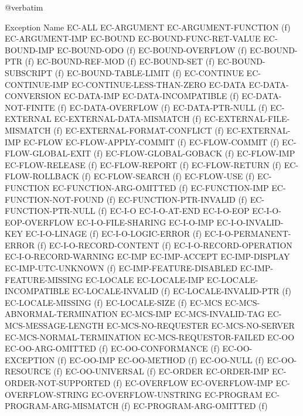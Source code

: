 @verbatim

Exception Name                  
EC-ALL
  EC-ARGUMENT               
    EC-ARGUMENT-FUNCTION (f)
    EC-ARGUMENT-IMP
  EC-BOUND                  
    EC-BOUND-FUNC-RET-VALUE
    EC-BOUND-IMP
    EC-BOUND-ODO (f)
    EC-BOUND-OVERFLOW (f)
    EC-BOUND-PTR (f)
    EC-BOUND-REF-MOD (f)
    EC-BOUND-SET (f)
    EC-BOUND-SUBSCRIPT (f)
    EC-BOUND-TABLE-LIMIT (f)
  EC-CONTINUE               
    EC-CONTINUE-IMP
    EC-CONTINUE-LESS-THAN-ZERO
  EC-DATA                   
    EC-DATA-CONVERSION
    EC-DATA-IMP
    EC-DATA-INCOMPATIBLE (f)
    EC-DATA-NOT-FINITE (f)
    EC-DATA-OVERFLOW (f)
    EC-DATA-PTR-NULL (f)
  EC-EXTERNAL               
    EC-EXTERNAL-DATA-MISMATCH (f)
    EC-EXTERNAL-FILE-MISMATCH (f)
    EC-EXTERNAL-FORMAT-CONFLICT (f)
    EC-EXTERNAL-IMP
  EC-FLOW                   
    EC-FLOW-APPLY-COMMIT (f)
    EC-FLOW-COMMIT (f)
    EC-FLOW-GLOBAL-EXIT (f)
    EC-FLOW-GLOBAL-GOBACK (f)
    EC-FLOW-IMP
    EC-FLOW-RELEASE (f)
    EC-FLOW-REPORT (f)
    EC-FLOW-RETURN (f)
    EC-FLOW-ROLLBACK (f)
    EC-FLOW-SEARCH (f)
    EC-FLOW-USE (f)
  EC-FUNCTION               
    EC-FUNCTION-ARG-OMITTED (f)
    EC-FUNCTION-IMP
    EC-FUNCTION-NOT-FOUND (f)
    EC-FUNCTION-PTR-INVALID (f)
    EC-FUNCTION-PTR-NULL (f)
  EC-I-O                    
    EC-I-O-AT-END
    EC-I-O-EOP
    EC-I-O-EOP-OVERFLOW
    EC-I-O-FILE-SHARING
    EC-I-O-IMP
    EC-I-O-INVALID-KEY
    EC-I-O-LINAGE (f)
    EC-I-O-LOGIC-ERROR (f)
    EC-I-O-PERMANENT-ERROR (f)
    EC-I-O-RECORD-CONTENT (f)
    EC-I-O-RECORD-OPERATION
    EC-I-O-RECORD-WARNING
  EC-IMP                    
    EC-IMP-ACCEPT
    EC-IMP-DISPLAY
    EC-IMP-UTC-UNKNOWN (f)
    EC-IMP-FEATURE-DISABLED
    EC-IMP-FEATURE-MISSING
  EC-LOCALE                 
    EC-LOCALE-IMP
    EC-LOCALE-INCOMPATIBLE
    EC-LOCALE-INVALID (f)
    EC-LOCALE-INVALID-PTR (f)
    EC-LOCALE-MISSING (f)
    EC-LOCALE-SIZE (f)
  EC-MCS                    
    EC-MCS-ABNORMAL-TERMINATION
    EC-MCS-IMP
    EC-MCS-INVALID-TAG
    EC-MCS-MESSAGE-LENGTH
    EC-MCS-NO-REQUESTER
    EC-MCS-NO-SERVER
    EC-MCS-NORMAL-TERMINATION
    EC-MCS-REQUESTOR-FAILED
  EC-OO                     
    EC-OO-ARG-OMITTED (f)
    EC-OO-CONFORMANCE (f)
    EC-OO-EXCEPTION (f)
    EC-OO-IMP
    EC-OO-METHOD (f)
    EC-OO-NULL (f)
    EC-OO-RESOURCE (f)
    EC-OO-UNIVERSAL (f)
  EC-ORDER                  
    EC-ORDER-IMP
    EC-ORDER-NOT-SUPPORTED (f)
  EC-OVERFLOW               
    EC-OVERFLOW-IMP
    EC-OVERFLOW-STRING
    EC-OVERFLOW-UNSTRING
  EC-PROGRAM                
    EC-PROGRAM-ARG-MISMATCH (f)
    EC-PROGRAM-ARG-OMITTED (f)
